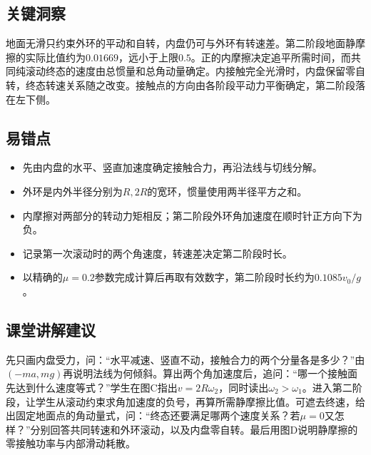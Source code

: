 \documentclass[UTF8,fontset=fandol,a4paper,11pt]{ctexart}
\begin{document}


\subsection*{关键洞察}

地面无滑只约束外环的平动和自转，内盘仍可与外环有转速差。第二阶段地面静摩擦的实际比值约为$0.01669$，远小于上限$0.5$。正的内摩擦决定追平所需时间，而共同纯滚动终态的速度由总惯量和总角动量确定。内接触完全光滑时，内盘保留零自转，终态转速关系随之改变。接触点的方向由各阶段平动力平衡确定，第二阶段落在左下侧。



\subsection*{易错点}

\begin{itemize}
\item 先由内盘的水平、竖直加速度确定接触合力，再沿法线与切线分解。
\item 外环是内外半径分别为$R,2R$的宽环，惯量使用两半径平方之和。
\item 内摩擦对两部分的转动力矩相反；第二阶段外环角加速度在顺时针正方向下为负。
\item 记录第一次滚动时的两个角速度，转速差决定第二阶段时长。
\item 以精确的$\mu=0.2$参数完成计算后再取有效数字，第二阶段时长约为$0.1085v_0/g$。
\end{itemize}



\subsection*{课堂讲解建议}

先只画内盘受力，问：“水平减速、竖直不动，接触合力的两个分量各是多少？”由$(-ma,mg)$再说明法线为何倾斜。算出两个角加速度后，追问：“哪一个接触面先达到什么速度等式？”学生在图C指出$v=2R\omega_2$，同时读出$\omega_2>\omega_1$。进入第二阶段，让学生从滚动约束求角加速度的负号，再算所需静摩擦比值。可遮去终速，给出固定地面点的角动量式，问：“终态还要满足哪两个速度关系？若$\mu=0$又怎样？”分别回答共同转速和外环滚动，以及内盘零自转。最后用图D说明静摩擦的零接触功率与内部滑动耗散。
\end{document}
